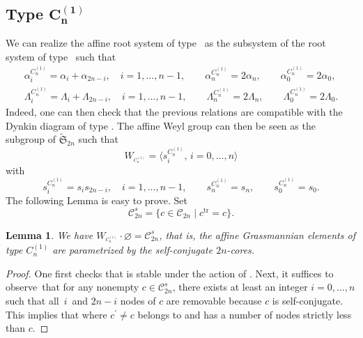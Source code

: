 \documentclass[pdftex]{sigma}
\newtheorem{Lemma}[Theorem]{Lemma}
\numberwithin{equation}{section}
\begin{document}
\subsection[Type C\_n\^{}(1)]{Type $\boldsymbol{C_{n}^{(1)}}$}

We can realize the affine root system of type~ as the subsystem
of the root system of type~ such that
\begin{gather}
\alpha _{i}^{C_{n}^{(1)}}=\alpha _{i}+\alpha _{2n-i}, \quad i=1,\dots ,n-1 ,\qquad
\alpha _{n}^{C_{n}^{(1)}}=2\alpha _{n}, \qquad
\alpha _{0}^{C_{n}^{(1)}}=2\alpha _{0},\nonumber\\
\Lambda _{i}^{C_{n}^{(1)}}=\Lambda _{i}+\Lambda _{2n-i}, \quad i=1,\dots ,n-1, \qquad
\Lambda _{n}^{C_{n}^{(1)}}=2\Lambda _{n} ,\qquad
\Lambda _{0}^{C_{n}^{(1)}}=2\Lambda _{0}.
  \label{RelC}
\end{gather}
Indeed, one can then check that the previous relations are compatible with
the Dynkin diagram of type . The affine Weyl group  can then be seen as the subgroup of $\widetilde{
	\mathfrak{S}}_{2n}$ such that
\[
W_{^{C_{n}^{(1)}}}=\bigl\langle s_{i}^{C_{n}^{(1)}},\, i=0,\dots ,n\bigr\rangle
\]
with
\[
s_{i}^{C_{n}^{(1)}}=s_{i}s_{2n-i},\quad i=1,\dots ,n-1, \qquad
s_{n}^{C_{n}^{(1)}}=s_{n}, \qquad
s_{0}^{C_{n}^{(1)}}=s_{0}.
\]
The following Lemma is easy to prove. Set
\begin{equation*}
\mathcal{C}_{2n}^{s}=\bigl\{c\in \mathcal{C}_{2n}\mid c^{\mathrm{tr}}=c \bigr\}.
\end{equation*}

\begin{Lemma}
	\label{Lemma_selfconjugate}We have $W_{^{C_{n}^{(1)}}}\cdot \varnothing =
	\mathcal{C}_{2n}^{s}$, that is, the affine Grassmannian elements of type $
	C_{n}^{(1)}$ are parametrized by the self-conjugate $2n$-cores.
\end{Lemma}

\begin{proof}
	One first checks that  is stable under the action of .
    Next, it suffices to ob\-serve~that for any nonempty $%
	c\in \mathcal{C}_{2n}^{s}$, there exists at least an integer $i=0,\dots ,n$
	such that all~$i$~and $2n-i$ nodes of $c$ are removable because $c$
	is self-conjugate. This implies that 
    where $c^{\prime }\neq c$ belongs to  and has a
	number of nodes strictly less than $c$.
\end{proof}
\end{document}
